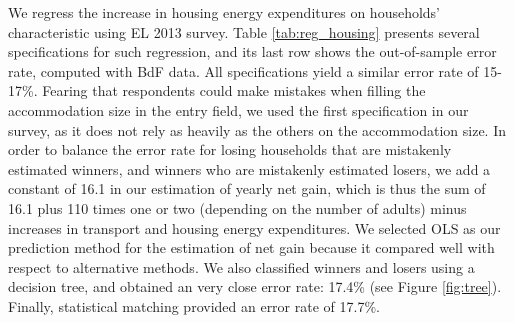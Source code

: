 \documentclass[11pt]{article}
\begin{document}
\begin{appendices}
We regress the increase in housing energy expenditures on households' characteristic using EL 2013 survey. Table \ref{tab:reg_housing} presents several specifications for such regression, and its last row shows the out-of-sample error rate, computed with BdF data. All specifications yield a similar error rate of 15-17\%. Fearing that respondents could make mistakes when filling the accommodation size in the entry field, we used the first specification in our survey, as it does not rely as heavily as the others on the accommodation size. In order to balance the error rate for losing households that are mistakenly estimated winners, and winners who are mistakenly estimated losers, we add a constant of 16.1 in our estimation of yearly net gain, which is thus the sum of 16.1 plus 110 times one or two (depending on the number of adults) minus increases in transport and housing energy expenditures. We selected OLS as our prediction method for the estimation of net gain because it compared well with respect to alternative methods. We also classified winners and losers using a decision tree, and obtained an very close error rate: 17.4\% (see Figure \ref{fig:tree}). Finally, statistical matching provided an error rate of 17.7\%.


\end{appendices}
\end{document}
